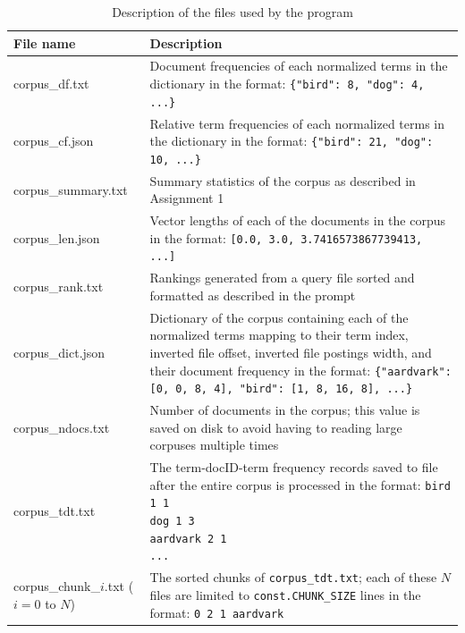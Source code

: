 \documentclass[11pt]{article}
\begin{document}
\begin{table}[!ht]
    \caption{Description of the files used by the program}
    \begin{center}
        
        \begin{tabular}{| L{3.5cm} | L{12cm} |}
        \hline
        \textbf{File name} & \textbf{Description}
        \\ \hline
        corpus\_df.txt & Document frequencies of each normalized terms in the dictionary in the format: \newline \texttt{\{"bird": 8, "dog": 4, ...\}}
        \\ \hline
        corpus\_cf.json & Relative term frequencies of each normalized terms in the dictionary in the format: \newline \texttt{\{"bird": 21, "dog": 10, ...\}}
        \\ \hline
        corpus\_summary.txt & Summary statistics of the corpus as described in Assignment 1
        \\ \hline
        corpus\_len.json & Vector lengths of each of the documents in the corpus in the format: \newline \texttt{{[0.0, 3.0, 3.7416573867739413, ...]}}
        \\ \hline
        corpus\_rank.txt & Rankings generated from a query file sorted and formatted as described in the prompt
        \\ \hline
        corpus\_dict.json & Dictionary of the corpus containing each of the normalized terms mapping to their term index, inverted file offset, inverted file postings width, and their document frequency in the format: \newline \texttt{\{"aardvark": [0, 0, 8, 4], "bird": [1, 8, 16, 8], ...\}}
        \\ \hline
        corpus\_ndocs.txt & Number of documents in the corpus; this value is saved on disk to avoid having to reading large corpuses multiple times
        \\ \hline
        corpus\_tdt.txt & The term-docID-term frequency records saved to file after the entire corpus is processed in the format: \newline \texttt{bird 1 1 \newline
        dog 1 3 \newline
        aardvark 2 1 \newline
        ...}
        \\ \hline
        corpus\_chunk\_$i$.txt ($i=0$ to $N$) & The sorted chunks of \texttt{corpus\_tdt.txt}; each of these  $N$ files are limited to \texttt{const.CHUNK\_SIZE} lines in the format: \newline \texttt{0 2 1 aardvark \newline
}
\end{tabular}
\end{center}
\end{table}
\end{document}
